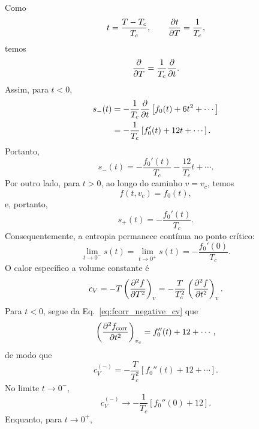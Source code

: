 \documentclass[11pt,a4paper]{article}
\begin{document}
%
Como
%
\begin{equation}
    t=\frac{T-T_c}{T_c},
    \qquad
    \pdv{t}{T}=\frac{1}{T_c},
\end{equation}
%
temos
%
\begin{equation}
    \pdv{}{T}
    =
    \frac{1}{T_c}\pdv{}{t}.
\end{equation}
%
Assim, para $t<0$,
%
\begin{align}
    s_-(t)
    &=
    -\frac{1}{T_c}
    \pdv{}{t}
    \left[
    f_0(t)+6t^2+\cdots
    \right]
    \nonumber\\
    &=
    -\frac{1}{T_c}
    \left[
    f_0'(t)+12t+\cdots
    \right].
\end{align}
%
Portanto,
%
\begin{equation}
    \boxed{
    s_-(t)
    =
    -\frac{f_0'(t)}{T_c}
    -\frac{12}{T_c}t+\cdots.
    }
\end{equation}
%
Por outro lado, para $t>0$, ao longo do caminho $v=v_c$, temos
%
\begin{equation}
    f(t,v_c)=f_0(t),
\end{equation}
%
e, portanto,
%
\begin{equation}
    \boxed{
    s_+(t)
    =
    -\frac{f_0'(t)}{T_c}.
    }
\end{equation}
%
Consequentemente, a entropia permanece contínua no ponto crítico:
%
\begin{equation}
    \lim_{t\to0^-}s(t)
    =
    \lim_{t\to0^+}s(t)
    =
    -\frac{f_0'(0)}{T_c}.
\end{equation}
%
O calor específico a volume constante é
%
\begin{equation}
    c_V
    =
    -T
    \left(\pdv[2]{f}{T}\right)_v
    =
    -\frac{T}{T_c^2}
    \left(\pdv[2]{f}{t}\right)_v.
\end{equation}
%
Para $t<0$, segue da Eq.~\eqref{eq:fcorr_negative_cv} que
%
\begin{equation}
    \left(\pdv[2]{f_{\rm corr}}{t}\right)_{v_c}
    =
    f_0''(t)+12+\cdots,
\end{equation}
%
de modo que
%
\begin{equation}
    c_V^{(-)}
    =
    -\frac{T}{T_c^2}
    \left[
    f_0''(t)+12+\cdots
    \right].
\end{equation}
%
No limite $t\to0^-$,
%
\begin{equation}
    \boxed{
    c_V^{(-)}
    \longrightarrow
    -\frac{1}{T_c}
    \left[
    f_0''(0)+12
    \right].
    }
    \label{eq:cv_minus}
\end{equation}
%
Enquanto, para $t\to0^+$,
\end{document}
